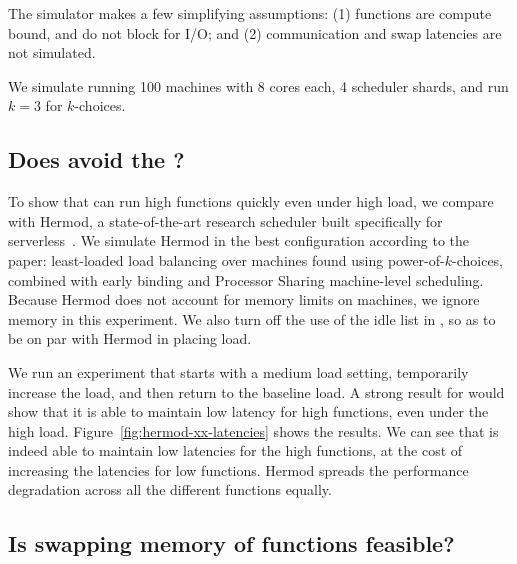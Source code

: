 The simulator makes a few simplifying assumptions: (1) functions are
compute bound, and do not block for I/O; and (2) communication and
swap latencies are not simulated.

We simulate running 100 machines with 8 cores each, 4 scheduler
shards, and run $k=3$ for $k$-choices.

\subsection{Does \sys{} avoid the \problem{}?}
\label{s:hermod}
  
To show that \sys{} can run high \class{} functions quickly even under
high load, we compare \sys{} with Hermod, a state-of-the-art research
scheduler built specifically for serverless~\cite{hermod}. We simulate
Hermod in the best configuration according to the paper: least-loaded
load balancing over machines found using power-of-$k$-choices,
combined with early binding and Processor Sharing machine-level
scheduling. Because Hermod does not account for memory limits on
machines, we ignore memory in this experiment.  We also turn off the
use of the idle list in \sys{}, so as to be on par with Hermod in
placing load.

We run an experiment that starts with a medium load setting,
temporarily increase the load, and then return to the baseline load. A
strong result for \sys{} would show that it is able to maintain low
latency for high \priceclass{} functions, even under the high load.
Figure~\ref{fig:hermod-xx-latencies} shows the results. We can see
that \sys{} is indeed able to maintain low latencies for the high
\class{} functions, at the cost of increasing the latencies for low
\class{} functions. Hermod spreads the performance degradation across
all the different functions equally.

\subsection{Is swapping memory of functions feasible?}
\label{s:memory}
  
